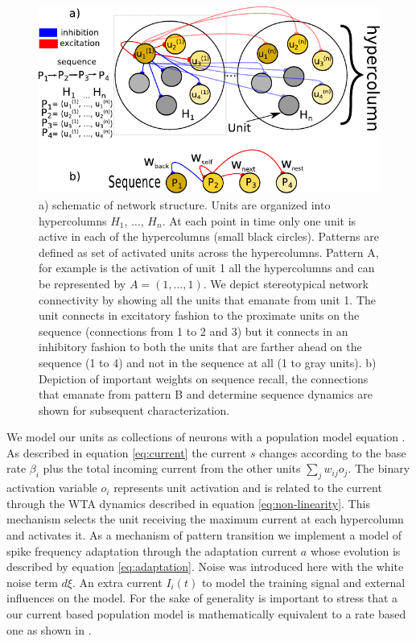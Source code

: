 \documentclass[10pt,a4paper]{article}
\begin{document}
\begin{figure}[H]
\centering
\includegraphics[scale=1.0]{diagram.pdf}
\caption{a) schematic of network structure. Units are organized into hypercolumns $H_1$, $\ldots$, $H_n$. At each point in time only one unit is active in each of the hypercolumns (small black circles). Patterns are defined as set of activated units across the hypercolumns. Pattern A, for example is the activation of unit 1 all the hypercolumns and can be represented by $A=(1, \ldots, 1)$. We depict stereotypical network connectivity by showing all the units that emanate from unit 1. The unit connects in excitatory fashion to the proximate units on the sequence (connections from 1 to 2 and 3) but it connects in an inhibitory fashion to both the units that are farther ahead on the sequence (1 to 4) and not in the sequence at all (1 to gray units). b) Depiction of important weights on sequence recall, the connections that emanate from pattern B and determine sequence dynamics are shown for subsequent characterization.}
\label{fig:networks_scheme}
\end{figure}


We model our units as collections of neurons with a population model equation \cite{wilson1972excitatory}. As described in equation \ref{eq:current} the current $s$ changes according to the base rate $\beta_i$ plus the total incoming current from the other units $ \sum_{j} w_{ij} o_j$. The binary activation variable $o_i$ represents unit activation and is related to the current through the WTA dynamics described in equation \ref{eq:non-linearity}. This  mechanism selects the unit receiving the maximum current at each hypercolumn and activates it. As a mechanism of pattern transition we implement a model of spike frequency adaptation through the adaptation current $a$ whose evolution is described by equation \ref{eq:adaptation}. Noise was introduced here with the white noise term $d\xi$. An extra current $I_i(t)$ to model the training signal and external influences on the model. For the sake of generality is important to stress that a our current based population model is mathematically equivalent to a rate based one as shown in \cite{miller2012mathematical}. 
\end{document}
